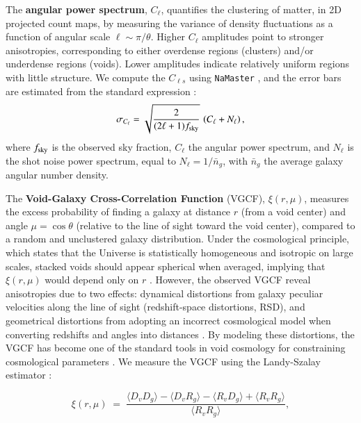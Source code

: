 \documentclass[]{aa} %
\begin{document}
The \textbf{angular power spectrum}, $C_\ell$, quantifies the clustering of matter, in 2D projected count maps, by measuring the variance of density fluctuations as a function of angular scale $\ell \sim \pi/\theta$. Higher $C_\ell$ amplitudes point to stronger anisotropies, corresponding to either overdense regions (clusters) and/or underdense regions (voids). Lower amplitudes indicate relatively uniform regions with little structure. We compute the $C_{\ell s}$  using \texttt{NaMaster}   \citep{alonso2019namaster}, and the error bars are estimated from the standard expression \citep{knox1995}:
\begin{equation}
\sigma_{C_\ell} = \sqrt{\frac{2}{(2\ell + 1) f_{\rm sky}}} \,\left(C_\ell + N_\ell \right),
\end{equation}
where $f_{\rm sky}$ is the observed sky fraction, $C_\ell$ the angular power spectrum, and $N_\ell$ is the shot noise power spectrum, equal to $N_\ell=1/\bar{n}_g$, with $\bar{n}_g$ the average galaxy angular number density.

The \textbf{Void-Galaxy Cross-Correlation Function} (VGCF), $\xi(r,\mu)$, measures the excess probability of finding a galaxy at distance $r$ (from a void center) and angle $\mu = \cos\theta$ (relative to the line of sight toward the void center), compared to a random and unclustered galaxy distribution. Under the cosmological principle, which states that the Universe is statistically homogeneous and isotropic on large scales, stacked voids should appear spherical when averaged, implying that $\xi(r,\mu)$ would depend only on $r$ \citep{lavaux&wandelt2012_stacking_vgcf_aprsd}. However, the observed VGCF reveal anisotropies due to two effects: dynamical distortions from galaxy peculiar velocities along the line of sight (redshift-space distortions, RSD), and geometrical distortions from adopting an incorrect cosmological model when converting redshifts and angles into distances \citep[Alcock–Paczynski effect, AP,][]{alcock_1979}. By modeling these distortions, the VGCF has become one of the standard tools in void cosmology for constraining cosmological parameters \citep{alcock_1979,ryden_1995, sutter2012_vgcf_ap,mao2017_vgcf_ap, nadathur2020_vgcf_aprsd, hamaus2020_vgcf_aprsd,hamaus_2022_vgcf_aprsd, woodfinden2022_vgcf_aprsd,correa2022_vgcf_aprsd, radinovic2023_vgcf_aprsd,verza2024_vgcf_and_vsf_aprsd,fraser2025_vgcf_aprsd,degni2025_vgcf_aprsd}. We measure the VGCF using the Landy-Szalay estimator \citep{landy_szalay}:  

\begin{equation}
\xi(r,\mu) \;=\; 
\frac{ 
\langle D_v D_g \rangle - \langle D_v R_g \rangle - \langle R_v D_g \rangle + \langle R_v R_g \rangle 
}{ 
\langle R_v R_g \rangle },
\end{equation}
\end{document}
